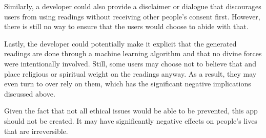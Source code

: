 \documentclass[10pt,twocolumn]{article}
\begin{document}
Similarly, a developer could also provide a disclaimer or dialogue that discourages users from using readings without receiving other people's consent first. However, there is still no way to ensure that the users would choose to abide with that. 

Lastly, the developer could potentially make it explicit that the generated readings are done through a machine learning algorithm and that no divine forces were intentionally involved. Still, some users may choose not to believe that and place religious or spiritual weight on the readings anyway. As a result, they may even turn to over rely on them, which has the significant negative implications discussed above.

Given the fact that not all ethical issues would be able to be prevented, this app should not be created. It may have significantly negative effects on people's lives that are irreversible. 

\printbibliography 
\end{document}
